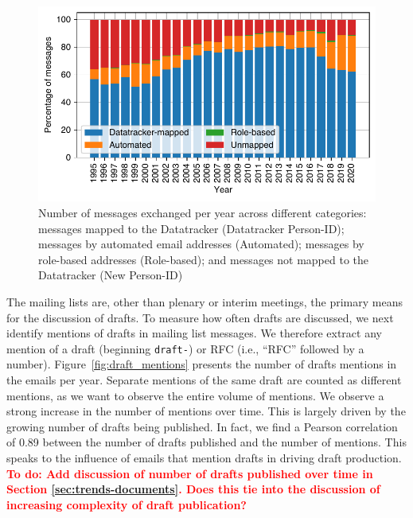 \documentclass[twocolumn,10pt]{article}
\newlength{\figureWidthOneColumn}
\newcommand{\todo}[1]{\textbf{\textcolor{red}{To do: #1}}}
\newcommand{\pb}[1]{\vspace{0.75ex}\noindent{\textbf{#1}}}
\begin{document}
\begin{figure}
  \centering
  \includegraphics[width=\figureWidthOneColumn]{figures-prev/imc-2021/emails/frequency_emails_yearly_categories2.pdf}
  \caption{
    Number of messages exchanged per year across different categories:
    messages mapped to the Datatracker (Datatracker Person-ID); messages
    by automated email addresses (Automated); messages by role-based
    addresses (Role-based); and messages not mapped to the Datatracker
    (New Person-ID)
  }
  \label{fig:emailvol_by_year_catg}
\end{figure}

\pb{Discussion of drafts:}
The mailing lists are, other than plenary or interim meetings, the primary
means for the discussion of drafts.  To measure how often drafts are
discussed, we next identify mentions of drafts in mailing list messages.
We therefore extract any mention of a draft (beginning \texttt{draft-}) or
RFC (i.e., ``RFC'' followed by a number).  Figure~\ref{fig:draft_mentions}
presents the number of drafts mentions in the emails per year. Separate
mentions of the same draft are counted as different mentions, as we want to
observe the entire volume of mentions.  We observe a strong increase in the
number of mentions over time.  This is largely driven by the growing number
of drafts being published. In fact, we find a Pearson correlation of 0.89
between the number of drafts published and the number of mentions. This
speaks to the influence of emails that mention drafts in driving draft
production.
\todo{Add discussion of number of drafts published over time in Section
\ref{sec:trends-documents}. Does this tie into the discussion of increasing
complexity of draft publication?}
\end{document}
